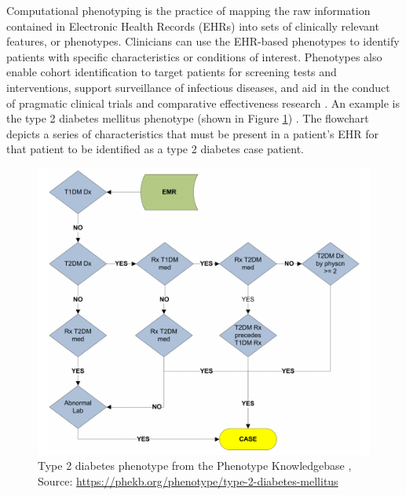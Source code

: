 \documentclass{sig-alternate-05-2015}
\begin{document}
Computational phenotyping is the practice of mapping the raw information contained in Electronic Health Records (EHRs) into sets of clinically relevant features, or phenotypes.
Clinicians can use the EHR-based phenotypes to identify patients with specific characteristics or conditions of interest.
Phenotypes also enable cohort identification to target patients for screening tests and interventions, support surveillance of infectious diseases, and aid in the conduct of pragmatic clinical trials and comparative effectiveness research \cite{Collaboratory:MR-x2zyZ}.
An example is the type 2 diabetes mellitus phenotype (shown in Figure \ref{fig:t2d-pheno}) \cite{kho_use_2012}.
The flowchart depicts a series of characteristics that must be present in a patient's EHR for that patient to be identified as a type 2 diabetes case patient.

\begin{figure} [t]
\centering
\includegraphics[width=\linewidth]{t2d-pheno.png}
\caption{Type 2 diabetes phenotype from the Phenotype Knowledgebase \cite{kho_use_2012}, Source: \protect\url{https://phekb.org/phenotype/type-2-diabetes-mellitus}}
\label{fig:t2d-pheno}
\end{figure}
\end{document}
